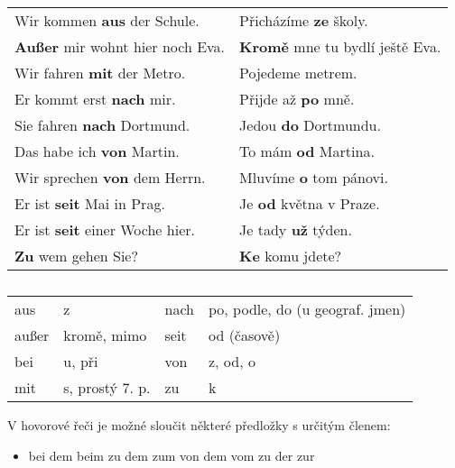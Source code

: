       \begin{table}[ht!]   %
      \hspace*{1em}
        \begin{tabular}{ll}
          \hline
            Wir kommen \textbf{aus} der Schule.      & Přicházíme \textbf{ze} školy.          \\
            \textbf{Außer} mir wohnt hier noch Eva.  & \textbf{Kromě} mne tu bydlí ještě Eva. \\
            Wir fahren \textbf{mit} der Metro.       & Pojedeme metrem.                       \\
            Er kommt erst \textbf{nach} mir.         & Přijde až \textbf{po} mně.             \\
            Sie fahren \textbf{nach} Dortmund.       & Jedou \textbf{do} Dortmundu.           \\
            Das habe ich \textbf{von} Martin.        & To mám \textbf{od} Martina.            \\
            Wir sprechen \textbf{von} dem Herrn.     & Mluvíme \textbf{o} tom pánovi.         \\
            Er ist \textbf{seit} Mai in Prag.        & Je \textbf{od} května v Praze.         \\
            Er ist \textbf{seit} einer Woche hier.   & Je tady \textbf{už} týden.             \\
            \textbf{Zu} wem gehen Sie?               & \textbf{Ke} komu jdete?                \\
          \hline
        \end{tabular}
        \caption*{ }
      \end{table}

      \begin{table}[ht!]
      \centering
        \begin{tabular}{llll}  %
          \hline
            aus   & z               & nach  & po, podle, do {\scriptsize (u geograf. jmen)}  \\
            außer & kromě, mimo     & seit  & od (časově)                                    \\
            bei   & u, při          & von   & z, od, o                                       \\
            mit   & s, prostý 7. p. & zu    & k                                              \\
          \hline
        \end{tabular}
        \caption*{}
      \end{table}
      V hovorové řeči je možné sloučit některé předložky s určitým členem: 
      \begin{itemize}
        \item bei dem \textrightarrow beim \hspace*{1em} 
              zu  dem \textrightarrow zum  \hspace*{1em} 
              von dem \textrightarrow vom  \hspace*{1em} 
              zu  der \textrightarrow zur  
      \end{itemize}
    
